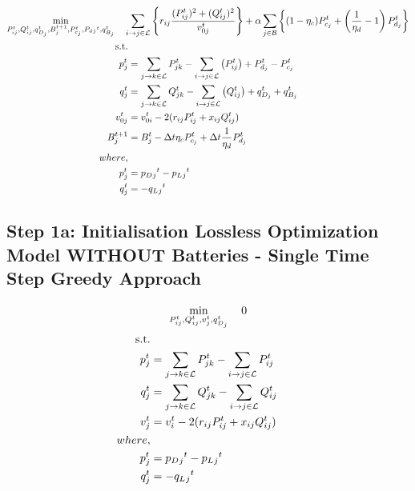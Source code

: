 \begin{gather}
    \min_{P_{ij}^t, Q_{ij}^t, q_{D_j}^t, B_{j}^{t+1},
	P_{c_j}^t, P_d{_j}^t, q_{B_j}^t} \quad
	\sum_{\fromto{i, j} \in \mathcal{L}} \left\{r_{ij}\frac{(P_{ij}^{t})^2 + (Q_{ij}^{t})^2}{v_{0j}^{t}} \right\} + 
	\alpha \sum_{j \in \mathcal{B}} \left\{(1- \eta_c)P_{c_j}^t + \left( \frac{1}{\eta_d}-1 \right) P_{d_j}^t \right\} \\
	\begin{align}
		\text{s.t.} & {}\nonumber \\
		{p_j^t} & = {\sum_{\fromto{j,k} \in \mathcal{L}} P_{jk}^t - \sum_{\fromto{i,j} \in \mathcal{L}}\left(P_{ij}^t\right) + P_{d_j}^t - P_{c_j}^t} && \\
		{q_j^t} & = {\sum_{\fromto{j,k} \in \mathcal{L}} Q_{jk}^t - \sum_{\fromto{i,j} \in \mathcal{L}}\left(Q_{ij}^t\right) + q_{D_j}^t + q_{B_j}^t} && \\
		{v_{0j}^t} & = {v_{0i}^t - 2(r_{ij}P_{ij}^t + x_{ij}Q_{ij}^t)} && \\
		{B_{j}^{t+1}} &= {B_{j}^{t} - \Delta t  \eta_c P_{c_j}^t + \Delta t\frac{1}{\eta_d} P_{d_j}^t} \\
		{where,} & {} \\
		{p_j^t} &= {p_D{_j}^t - p_L{_j}^t} \\
		{q_j^t} &= {-q_L{_j}^t}
	\end{align}
\end{gather}

\subsection*{Step 1a: Initialisation Lossless Optimization Model WITHOUT Batteries - Single Time Step Greedy Approach}


\begin{gather}
    \min_{P_{ij}^t, Q_{ij}^t, v_{j}^t,  q_{D_j}^t} \quad 0 \\
	\begin{align}
		\text{s.t.} & {}\nonumber \\
		{p_j^t} & = {\sum_{\fromto{j,k} \in \mathcal{L}} P_{jk}^t - \sum_{\fromto{i,j} \in \mathcal{L}} P_{ij}^t } && \\
		{q_j^t} & = {\sum_{\fromto{j,k} \in \mathcal{L}} Q_{jk}^t - \sum_{\fromto{i,j} \in \mathcal{L}} Q_{ij}^t } && \\
		{v_j^t} & = {v_{i}^t - 2(r_{ij}P_{ij}^t + x_{ij}Q_{ij}^t)} && \\
		{where,} & {} \\
		{p_j^t} &= {p_D{_j}^t - p_L{_j}^t} \\
		{q_j^t} &= {-q_L{_j}^t}
	\end{align}
\end{gather}

